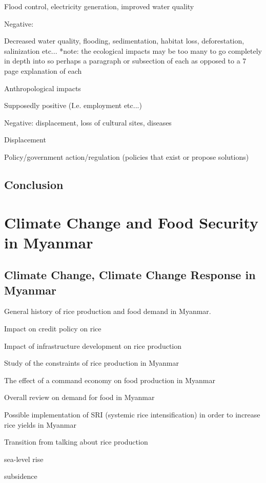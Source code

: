 \documentclass{book}\usepackage{knitr}
\begin{document}
Flood control, electricity generation, improved water quality 

Negative: 

Decreased water quality, flooding, sedimentation, habitat loss, deforestation, salinization etc... *note: the ecological impacts may be too many to go completely in depth into so perhaps a paragraph or subsection of each as opposed to a 7 page explanation of each 

Anthropological impacts 

Supposedly positive (I.e. employment etc...)

Negative: displacement, loss of cultural sites, diseases 

Displacement

Policy/government action/regulation  (policies that exist or propose solutions)

\section{Conclusion}



\chapter{Climate Change and Food Security in Myanmar}



\section{Climate Change, Climate Change Response in Myanmar}


General history of rice production and food demand in Myanmar. 

Impact on credit policy on rice 

Impact of infrastructure development on rice production

Study of the constraints of rice production in Myanmar

The effect of a command economy on food production in Myanmar 

Overall review on demand for food in Myanmar 

Possible implementation of SRI (systemic rice intensification) in order to increase rice yields in Myanmar

Transition from talking about rice production

sea-level rise

subsidence
\end{document}
